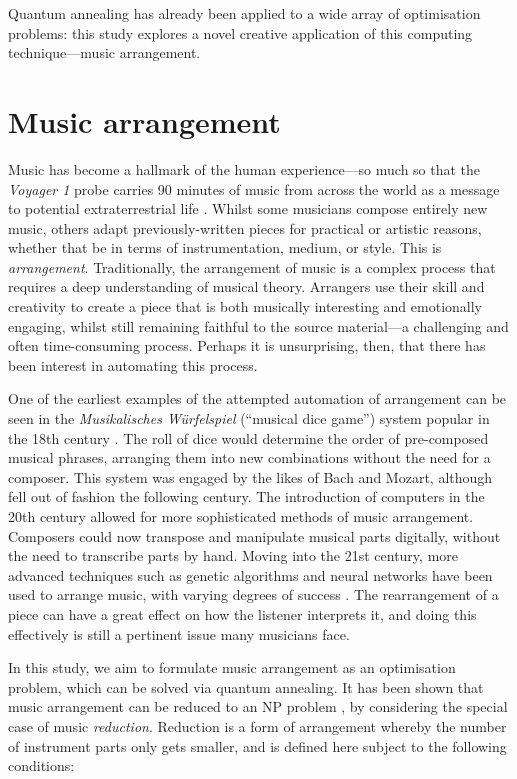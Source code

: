 \documentclass[twocolumn]{article}
\theoremstyle{definition}
\begin{document}
Quantum annealing has already been applied to a wide array of optimisation problems: this study explores a novel creative application of this computing technique---music arrangement.

\section{Music arrangement}
\label{sec:arrangement}

Music has become a hallmark of the human experience---so much so that the \textit{Voyager 1} probe carries 90 minutes of music from across the world as a message to potential extraterrestrial life \cite{nasa_golden_2024}. Whilst some musicians compose entirely new music, others adapt previously-written pieces for practical or artistic reasons, whether that be in terms of instrumentation, medium, or style. This is \emph{arrangement}.
Traditionally, the arrangement of music is a complex process that requires a deep understanding of musical theory. Arrangers use their skill and creativity to create a piece that is both musically interesting and emotionally engaging, whilst still remaining faithful to the source material---a challenging and often time-consuming process. Perhaps it is unsurprising, then, that there has been interest in automating this process.

One of the earliest examples of the attempted automation of arrangement can be seen in the \textit{Musikalisches Würfelspiel} (``musical dice game'') system popular in the 18th century \cite{nierhaus_algorithmic_2009}. The roll of dice would determine the order of pre-composed musical phrases, arranging them into new combinations without the need for a composer. This system was engaged by the likes of Bach and Mozart, although fell out of fashion the following century.
The introduction of computers in the 20th century allowed for more sophisticated methods of music arrangement. Composers could now transpose and manipulate musical parts digitally, without the need to transcribe parts by hand. Moving into the 21st century, more advanced techniques such as genetic algorithms and neural networks have been used to arrange music, with varying degrees of success \cite{nierhaus_algorithmic_2009}. The rearrangement of a piece can have a great effect on how the listener interprets it, and doing this effectively is still a pertinent issue many musicians face. 

In this study, we aim to formulate music arrangement as an optimisation problem, which can be solved via quantum annealing. It has been shown that music arrangement can be reduced to an NP problem \cite{moses_computational_2016}, by considering the special case of music \emph{reduction}. Reduction is a form of arrangement whereby the number of instrument parts only gets smaller, and is defined here subject to the following conditions:
\end{document}
